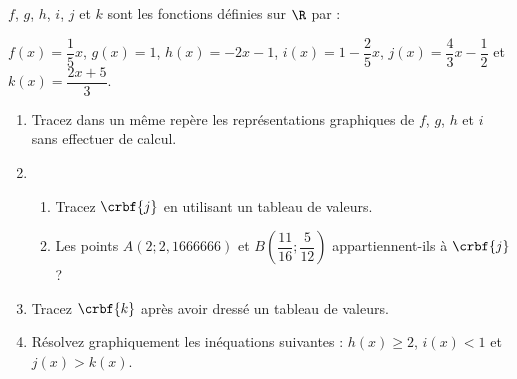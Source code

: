 %
%
%
\begin{exr} $f$, $g$, $h$, $i$, $j$ et $k$ sont les fonctions définies sur $\R$ par : \vspace*{1ex}

{\centering
$f(x)=\dfrac{1}{5}x$, $g(x)=1$, $h(x)=-2x-1$, $i(x)=1-\dfrac{2}{5}x$, $j(x)= \dfrac{4}{3}x-\dfrac{1}{2}$ et $k(x)=\dfrac{2x+5}{3}$.

}
%
\begin{enumerate}
\item Tracez dans un même repère les représentations graphiques de $f$, $g$, $h$ et $i$  sans effectuer de calcul. 
\item \begin{enumerate}
	\item Tracez $\crbf{j}$ en utilisant un tableau de valeurs.
	\item Les points $A(2;2,1666666)$ et $B\left(\dfrac{11}{16};\dfrac{5}{12}\right)$ appartiennent-ils à  $\crbf{j}$ ?
	\end{enumerate}
\item Tracez $\crbf{k}$ après avoir dressé un tableau de valeurs.
\item  Résolvez graphiquement les inéquations suivantes : $h(x)\geqslant2$, $i(x)<1$ et $j(x)>k(x)$.
\end{enumerate}
\end{exr}%
